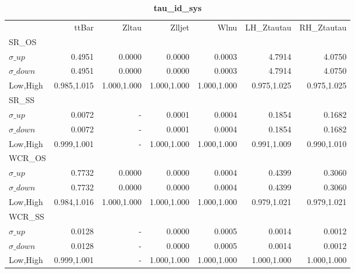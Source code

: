 \documentclass[11pt,oneside,a4paper]{article}
\begin{document}
\begin{table}
\caption{\bf{tau\_id\_sys}}
\centering
\begin{tabular}{lrrrrrr}
& ttBar & Zltau & Zlljet & Wlnu & LH\_Ztautau & RH\_Ztautau \\
SR\_OS &  &  &  &  &  &  \\
$\sigma\_up$ & 0.4951 & 0.0000 & 0.0000 & 0.0003 & 4.7914 & 4.0750 \\
$\sigma\_down$ & 0.4951 & 0.0000 & 0.0000 & 0.0003 & 4.7914 & 4.0750 \\
Low,High & 0.985,1.015 & 1.000,1.000 & 1.000,1.000 & 1.000,1.000 & 0.975,1.025 & 0.975,1.025 \\

\hline
SR\_SS &  &  &  &  &  &  \\
$\sigma\_up$ & 0.0072 & - & 0.0001 & 0.0004 & 0.1854 & 0.1682 \\
$\sigma\_down$ & 0.0072 & - & 0.0001 & 0.0004 & 0.1854 & 0.1682 \\
Low,High & 0.999,1.001 & - & 1.000,1.000 & 1.000,1.000 & 0.991,1.009 & 0.990,1.010 \\

\hline
WCR\_OS &  &  &  &  &  &  \\
$\sigma\_up$ & 0.7732 & 0.0000 & 0.0000 & 0.0004 & 0.4399 & 0.3060 \\
$\sigma\_down$ & 0.7732 & 0.0000 & 0.0000 & 0.0004 & 0.4399 & 0.3060 \\
Low,High & 0.984,1.016 & 1.000,1.000 & 1.000,1.000 & 1.000,1.000 & 0.979,1.021 & 0.979,1.021 \\

\hline
WCR\_SS &  &  &  &  &  &  \\
$\sigma\_up$ & 0.0128 & - & 0.0000 & 0.0005 & 0.0014 & 0.0012 \\
$\sigma\_down$ & 0.0128 & - & 0.0000 & 0.0005 & 0.0014 & 0.0012 \\
Low,High & 0.999,1.001 & - & 1.000,1.000 & 1.000,1.000 & 1.000,1.000 & 1.000,1.000 \\
\end{tabular}
\end{table}
\end{document}
